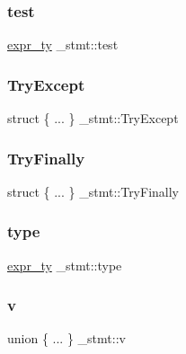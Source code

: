 \mbox{\label{struct__stmt_a8515b2fedbd67231f7c909d52ebadfa5}} 
\subsubsection{\texorpdfstring{test}{test}}
{\footnotesize\ttfamily \mbox{\hyperlink{_python-ast_8h_a56d3705e020a071405094a220c4592bd}{expr\+\_\+ty}} \+\_\+stmt\+::test}

\mbox{\label{struct__stmt_a80ed845edbf81628378c28ceb7a0d3f7}} 
\subsubsection{\texorpdfstring{TryExcept}{TryExcept}}
{\footnotesize\ttfamily struct \{ ... \}   \+\_\+stmt\+::\+Try\+Except}

\mbox{\label{struct__stmt_ac636fc02a188ea552a4706dc30b7f4e6}} 
\subsubsection{\texorpdfstring{TryFinally}{TryFinally}}
{\footnotesize\ttfamily struct \{ ... \}   \+\_\+stmt\+::\+Try\+Finally}

\mbox{\label{struct__stmt_a239243bd19534455c5048e0b6fe25d4c}} 
\subsubsection{\texorpdfstring{type}{type}}
{\footnotesize\ttfamily \mbox{\hyperlink{_python-ast_8h_a56d3705e020a071405094a220c4592bd}{expr\+\_\+ty}} \+\_\+stmt\+::type}

\mbox{\label{struct__stmt_ac2cd778ce0da149341b0323591258319}} 
\subsubsection{\texorpdfstring{v}{v}}
{\footnotesize\ttfamily union \{ ... \}   \+\_\+stmt\+::v}

